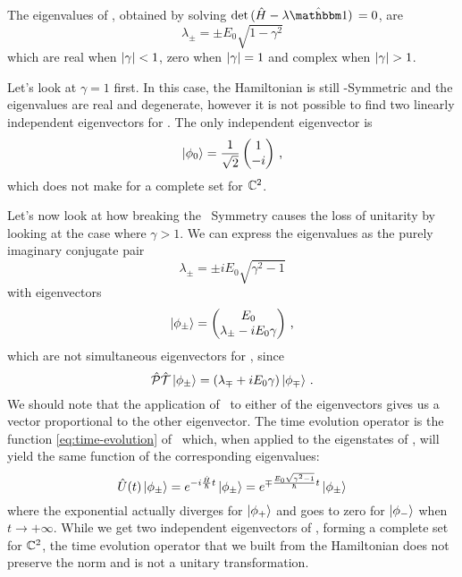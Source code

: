         The eigenvalues of \hH, obtained by solving $\det\pqty*{\hH - \lambda\hidM} = 0$, are
        \begin{equation*}
            \lambda_\pm = \pm E_0 \sqrt{1-\gamma^2}
        \end{equation*}
        which are real when $\abs{\gamma} < 1$, zero when $\abs{\gamma} = 1$ and complex when $\abs{\gamma} > 1$.
        
        Let's look at $\gamma = 1$ first. In this case, the Hamiltonian is still \PT-Symmetric and the eigenvalues are real and degenerate, however it is not possible to find two linearly independent eigenvectors for \hH. The only independent eigenvector is
        \begin{equation*}
            \ket{\phi_0} = \frac{1}{\sqrt{2}}\pmqty{1 \\ -i}
            \mycomma
        \end{equation*}
        which does not make for a complete set for $\mathbb{C}^2$.

        Let's now look at how breaking the \PT\ Symmetry causes the loss of unitarity by looking at the case where $\gamma > 1$. We can express the eigenvalues as the purely imaginary conjugate pair
        \begin{equation*}
            \lambda_\pm = \pm i E_0 \sqrt{\gamma^2 - 1}
        \end{equation*}
        with eigenvectors
        \begin{equation*}
            \ket{\phi_\pm} = \pmqty{E_0 \\ \lambda_\pm - i E_0 \gamma }
            \mycomma
        \end{equation*}
        which are not simultaneous eigenvectors for \hPT, since
        \begin{equation*}
            \hPT\ket{\phi_\pm} = \pqty{\lambda_\mp + i E_0 \gamma}\ket{\phi_\mp}
            \myperiod
        \end{equation*}
        We should note that the application of \hPT\ to either of the eigenvectors gives us a vector proportional to the other eigenvector. The time evolution operator is the function \eqref{eq:time-evolution} of \hH\ which, when applied to the eigenstates of \hH, will yield the same function of the corresponding eigenvalues:
        \begin{equation*}
            \hU\pqty{t}\ket{\phi_\pm} = \myexp{-i\frac{\hH}{\hbar}t}\ket{\phi_\pm} = \myexp{\mp\frac{E_0\sqrt{\gamma^2-1}}{\hbar}t}\ket{\phi_\pm}
        \end{equation*}
        where the exponential actually diverges for $\ket{\phi_+}$ and goes to zero for $\ket{\phi_-}$ when $t\to +\infty$. While we get two independent eigenvectors of \hH, forming a complete set for $\mathbb{C}^2$, the time evolution operator that we built from the Hamiltonian does not preserve the norm and is not a unitary transformation.

